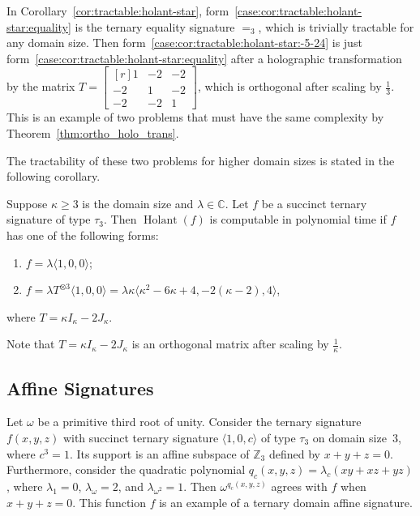 \documentclass[11pt]{article}
\newcommand{\Holant}{\operatorname{Holant}}
\begin{document}
In Corollary~\ref{cor:tractable:holant-star},
form~\ref{case:cor:tractable:holant-star:equality} is the ternary equality signature $=_3$,
which is trivially tractable for any domain size.
Then form~\ref{case:cor:tractable:holant-star:-5-24} is just form~\ref{case:cor:tractable:holant-star:equality}
after a holographic transformation by the matrix $T = \left[\begin{smallmatrix*}[r] 1 & -2 & -2 \\ -2 & 1 & -2 \\ -2 & -2 & 1 \end{smallmatrix*}\right]$,
which is orthogonal after scaling by $\frac{1}{3}$.
This is an example of two problems that must have the same complexity by Theorem~\ref{thm:ortho_holo_trans}.

The tractability of these two problems for higher domain sizes is stated in the following corollary.

\begin{corollary} \label{cor:tractable:100}
 Suppose $\kappa \ge 3$ is the domain size and $\lambda \in \mathbb{C}$.
 Let $f$ be a succinct ternary signature of type $\tau_3$.
 Then $\Holant(f)$ is computable in polynomial time if $f$ has one of the following forms:
 \begin{enumerate}
  \item $f = \lambda               \langle 1,0,0 \rangle$; \label{case:cor:tractable:equality:equality}
  \item $f = \lambda T^{\otimes 3} \langle 1,0,0 \rangle = \lambda \kappa \langle \kappa^2 - 6 \kappa + 4, -2 (\kappa - 2), 4 \rangle$, \label{case:cor:tractable:equality:trans}
 \end{enumerate}
 where $T = \kappa I_\kappa - 2 J_\kappa$.
\end{corollary}

Note that $T = \kappa I_\kappa - 2 J_\kappa$ is an orthogonal matrix after scaling by $\frac{1}{\kappa}$.

\subsection{Affine Signatures}

Let $\omega$ be a primitive third root of unity.
Consider the ternary signature $f(x,y,z)$ with succinct ternary signature $\langle 1,0,c \rangle$ of type $\tau_3$ on domain size~$3$,
where $c^3 = 1$.
Its support is an affine subspace of $\mathbb{Z}_3$ defined by $x + y + z = 0$.
Furthermore, consider the quadratic polynomial $q_c(x, y, z) = \lambda_c (x y + x z + y z)$,
where $\lambda_1 = 0$, $\lambda_\omega = 2$, and $\lambda_{\omega^2} = 1$.
Then $\omega^{q_c(x, y, z)}$ agrees with $f$ when $x + y + z = 0$.
This function $f$ is an example of a ternary domain affine signature.
\end{document}

